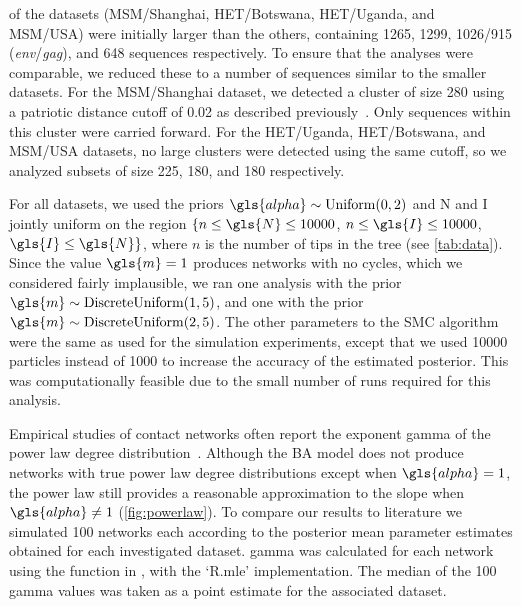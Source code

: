   of the datasets (MSM/Shanghai, HET/Botswana, HET/Uganda, 
and MSM/USA) were initially larger than the others, containing 1265, 1299,
1026/915 (\textit{env}/\textit{gag}), and 648 sequences respectively. To ensure
that the analyses were comparable, we reduced these to a number of sequences
similar to the smaller datasets. For the MSM/Shanghai dataset, we detected a
cluster of size 280 using a patriotic distance cutoff of 0.02 as described
previously~\autocite{poon2015impact}. Only sequences within this cluster were
carried forward. For the HET/Uganda, HET/Botswana, and MSM/USA datasets, no
large clusters were detected using the same cutoff, so we analyzed subsets of
size 225, 180, and 180 respectively. 

For all datasets, we used the priors $\gls{alpha} \sim \Uniform(0, 2)$ and
\gls{N} and \gls{I} jointly uniform on the region $\{n \leq \gls{N} \leq
10000$, $n \leq \gls{I} \leq 10000$, $\gls{I} \leq \gls{N}\}$, where $n$ is the
number of tips in the tree (see \cref{tab:data}). Since the value $\gls{m} = 1$
produces networks with no cycles, which we considered fairly implausible, we
ran one analysis with the prior $\gls{m} \sim \DiscreteUniform(1, 5)$, and one
with the prior $\gls{m} \sim \DiscreteUniform(2, 5)$. The other parameters to
the SMC algorithm were the same as used for the simulation experiments, except
that we used 10000 particles instead of 1000 to increase the accuracy of the
estimated posterior. This was computationally feasible due to the small number
of runs required for this analysis.

Empirical studies of contact networks often report the exponent \gls{gamma} of
the power law degree distribution~\autocite{colgate1989risk, liljeros2001web,
schneeberger2004scale, clemenccon2015statistical, rothenberg2007large,
brown2011transmission}. Although the \gls{BA} model does not produce networks
with true power law degree distributions except when $\gls{alpha} = 1$, the
power law still provides a reasonable approximation to the slope when
$\gls{alpha} \neq 1$ (\cref{fig:powerlaw}).  To compare our results to
 literature we simulated 100 networks each according to
the posterior mean parameter estimates obtained for each investigated dataset.
\gls{gamma} was calculated for each network using the
 function in , with the `R.mle'
implementation. The median of the 100 \gls{gamma} values was taken as a point
estimate for the associated dataset.

